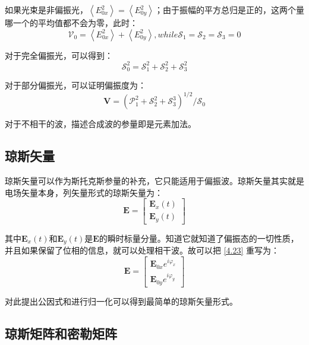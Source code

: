 \documentclass[UTF8]{ctexart}
\newcommand{\backdoc}{\normalsize}
\begin{document}
	如果光束是非偏振光，$\left\langle E_{0 x}^{2}\right\rangle=\left\langle E_{0 y}^{2}\right\rangle$；由于振幅的平方总归是正的，这两个量哪一个的平均值都不会为零，此时：
	$$
	\mathscr{V}_{0}=\left\langle E_{0 x}^{2}\right\rangle+\left\langle E_{0 y}^{2}\right\rangle, while   \mathscr{S}_{1}=\mathscr{S}_{2}=\mathscr{S}_{3}=0
	$$
	
	对于完全偏振光，可以得到：
	\begin{equation}
	\mathscr{S}_{0}^{2}=\mathscr{S}_{1}^{2}+\mathscr{S}_{2}^{2}+\mathscr{S}_{3}^{2}
	\end{equation}
	
	对于部分偏振光，可以证明偏振度为：
	\begin{equation}
	\boldsymbol{V}=\left(\mathscr{P}_{1}^{2}+\mathscr{S}_{2}^{2}+\mathscr{S}_{3}^{3}\right)^{1 / 2} / \mathscr{S}_{0}
	\end{equation}
	
	对于不相干的波，描述合成波的参量即是元素加法。
	
	\subsection{琼斯矢量}
	
	\backdoc
	琼斯矢量可以作为斯托克斯参量的补充，它只能适用于偏振波。琼斯矢量其实就是电场矢量本身，列矢量形式的琼斯矢量为：
	\begin{equation}
	\mathbf{E}=\left[ \begin{array}{c}{\boldsymbol{E}_{x}(t)} \\ {\boldsymbol{E}_{y}(t)}\end{array}\right]\label{4.23}
	\end{equation}
	
	\noindent 其中$\boldsymbol{E}_{x}(t)$和$\boldsymbol{E}_{y}(t)$是$\boldsymbol{E}$的瞬时标量分量。知道它就知道了偏振态的一切性质，并且如果保留了位相的信息，就可以处理相干波。故可以把 \ref{4.23} 重写为：
	\begin{equation}
	\mathbf{E}=\left[ \begin{array}{c}{\boldsymbol{E}_{0 x} e^{i \varphi_{x}}} \\ {\boldsymbol{E}_{0 y} e^{i \varphi_{y}}}\end{array}\right]
	\end{equation}
	
	对此提出公因式和进行归一化可以得到最简单的琼斯矢量形式。
	
	\subsection{琼斯矩阵和密勒矩阵}
	
\end{document}
